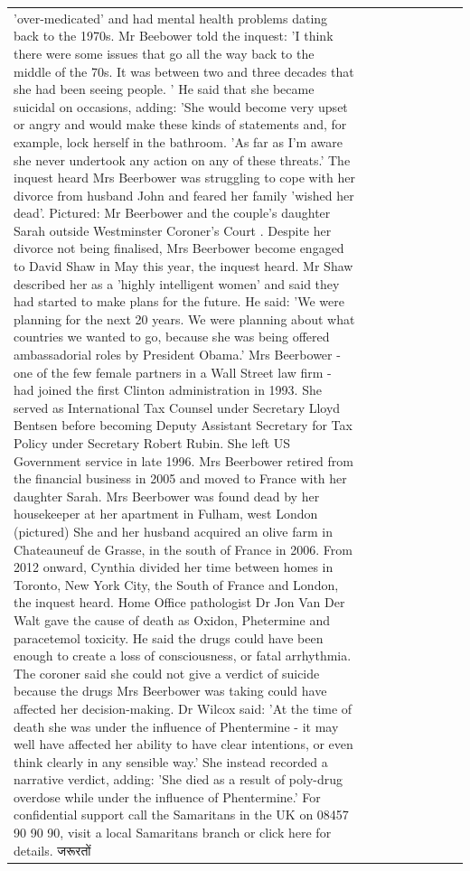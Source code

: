 \begin{table}[H]
\begin{tabular}{lllrlllll}
'over-medicated' and had mental health problems dating back to the 1970s. Mr Beebower told the inquest: 'I think there were some issues that go all the way back to the middle of the 70s. It was between two and three decades that she had been seeing people. ' He said that she became suicidal on occasions, adding: 'She would become very upset or angry and would make these kinds of statements and, for example, lock herself in the bathroom. 'As far as I'm aware she never undertook any action on any of these threats.' The inquest heard Mrs Beerbower was struggling to cope with her divorce from husband John and feared her family 'wished her dead'. Pictured: Mr Beerbower and the couple's daughter Sarah outside Westminster Coroner's Court . Despite her divorce not being finalised, Mrs Beerbower become engaged to David Shaw in May this year, the inquest heard. Mr Shaw described her as a 'highly intelligent women' and said they had started to make plans for the future. He said: 'We were planning for the next 20 years. We were planning about what countries we wanted to go, because she was being offered ambassadorial roles by President Obama.' Mrs Beerbower - one of the few female partners in a Wall Street law firm - had joined the first Clinton administration in 1993. She served as International Tax Counsel under Secretary Lloyd Bentsen before becoming Deputy Assistant Secretary for Tax Policy under Secretary Robert Rubin. She left US Government service in late 1996. Mrs Beerbower retired from the financial business in 2005 and moved to France with her daughter Sarah. Mrs Beerbower was found dead by her housekeeper at her apartment in Fulham, west London (pictured) She and her husband acquired an olive farm in Chateauneuf de Grasse, in the south of France in 2006. From 2012 onward, Cynthia divided her time between homes in Toronto, New York City, the South of France and London, the inquest heard. Home Office pathologist Dr Jon Van Der Walt gave the cause of death as Oxidon, Phetermine and paracetemol toxicity. He said the drugs could have been enough to create a loss of consciousness, or fatal arrhythmia. The coroner said she could not give a verdict of suicide because the drugs Mrs Beerbower was taking could have affected her decision-making. Dr Wilcox said: 'At the time of death she was under the influence of Phentermine - it may well have affected her ability to have clear intentions, or even think clearly in any sensible way.' She instead recorded a narrative verdict, adding: 'She died as a result of poly-drug overdose while under the influence of Phentermine.' For confidential support call the Samaritans in the UK on 08457 90 90 90, visit a local Samaritans branch or click here for details. जरूरतों \\

\end{tabular}
\end{table}
